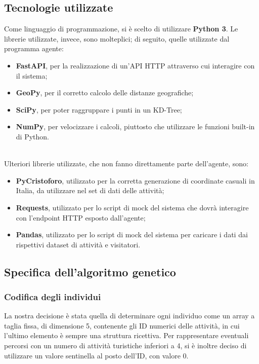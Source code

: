 \documentclass{CSUniSchoolLabReport}
\begin{document}
\subsection{Tecnologie utilizzate}

Come linguaggio di programmazione, si è scelto di utilizzare \textbf{Python 3}.
Le librerie utilizzate, invece, sono molteplici; di seguito, quelle utilizzate dal programma agente:

\begin{itemize}
	\item \textbf{FastAPI}, per la realizzazione di un'API HTTP attraverso cui interagire con il sistema;
	\item \textbf{GeoPy}, per il corretto calcolo delle distanze geografiche;
	\item \textbf{SciPy}, per poter raggruppare i punti in un KD-Tree;
	\item \textbf{NumPy}, per velocizzare i calcoli, piuttosto che utilizzare le funzioni built-in di Python.
\end{itemize}

$ $\\
Ulteriori librerie utilizzate, che non fanno direttamente parte dell'agente, sono:
\begin{itemize}
	\item \textbf{PyCristoforo}, utilizzato per la corretta generazione di coordinate casuali in Italia, da utilizzare nel set di dati delle attività;
	\item \textbf{Requests}, utilizzato per lo script di mock del sistema che dovrà interagire con l'endpoint HTTP esposto dall'agente;
	\item \textbf{Pandas}, utilizzato per lo script di mock del sistema per caricare i dati dai rispettivi dataset di attività e visitatori.
\end{itemize}

\pagebreak{}
\subsection{Specifica dell'algoritmo genetico}

\subsubsection{Codifica degli individui}

La nostra decisione è stata quella di determinare ogni individuo come un array a taglia fissa, di dimensione 5, contenente gli ID numerici delle attività, in cui l'ultimo elemento è sempre una struttura ricettiva. Per rappresentare eventuali percorsi con un numero di attività turistiche inferiori a 4, si è inoltre deciso di utilizzare un valore sentinella al posto dell'ID, con valore 0.
\end{document}
